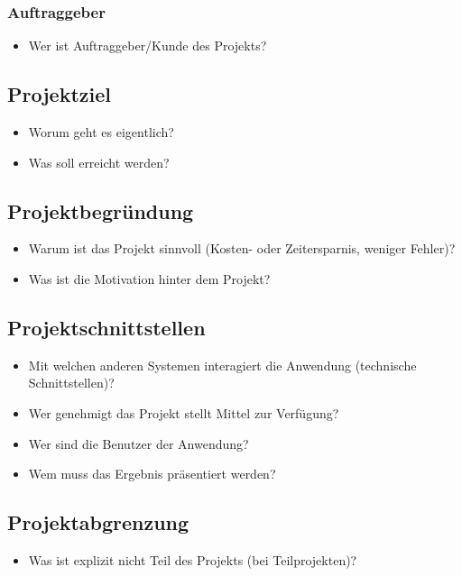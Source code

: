 \subsubsection{Auftraggeber} 
\label{sec:Auftraggeber}

\begin{itemize}
	\item Wer ist Auftraggeber/Kunde des Projekts?
\end{itemize}


\subsection{Projektziel} 
\label{sec:Projektziel}
\begin{itemize}
	\item Worum geht es eigentlich?
	\item Was soll erreicht werden?
\end{itemize}


\subsection{Projektbegründung} 
\label{sec:Projektbegruendung}
\begin{itemize}
	\item Warum ist das Projekt sinnvoll (\zB Kosten- oder Zeitersparnis, weniger Fehler)?
	\item Was ist die Motivation hinter dem Projekt?
\end{itemize}


\subsection{Projektschnittstellen} 
\label{sec:Projektschnittstellen}
\begin{itemize}
	\item Mit welchen anderen Systemen interagiert die Anwendung (technische Schnittstellen)?
	\item Wer genehmigt das Projekt \bzw stellt Mittel zur Verfügung? 
	\item Wer sind die Benutzer der Anwendung?
	\item Wem muss das Ergebnis präsentiert werden?
\end{itemize}


\subsection{Projektabgrenzung} 
\label{sec:Projektabgrenzung}
\begin{itemize}
	\item Was ist explizit nicht Teil des Projekts (\insb bei Teilprojekten)?
\end{itemize}
